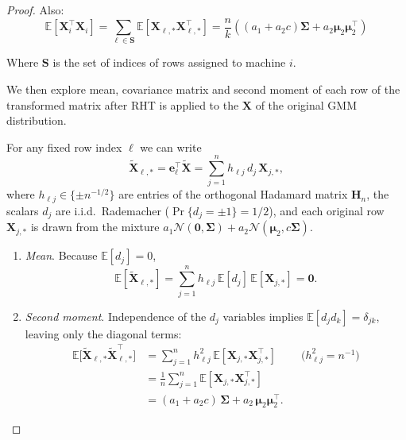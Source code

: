 \documentclass[11pt]{article}
\numberwithin{equation}{section}
\theoremstyle{plain}
\theoremstyle{definition}
\theoremstyle{remark}
\begin{document}
\begin{appendix}
\begin{proof}
          Also:
          \[
          \mathbb{E}[\mathbf{X}_i^{\top}\mathbf{X}_i] = \sum_{\ell \in \mathbf{S}} \mathbb{E}[\mathbf{X}_{\ell,\ast}\mathbf{X}_{\ell,\ast}^{\top}] = \frac{n}{k}\left((a_{1}+a_{2}c)\mathbf{\Sigma} + a_{2}\boldsymbol{\mu}_{2}\boldsymbol{\mu}_{2}^{\top}\right)
          \]

          Where $\mathbf{S}$ is the set of indices of rows assigned to machine $i$.


      We then explore mean, covariance matrix and second moment of each row of the transformed matrix after RHT is applied to the $\mathbf{X}$ of the original GMM distribution.

        For any fixed row index \( \ell \) we can write
         \[
           \mathbf{\tilde{X}}_{\ell,\ast}
            = \mathbf{e}_{\ell}^{\top}\mathbf{\tilde{X}}
            = \sum_{j=1}^{n} h_{\ell j}\,d_j\,\mathbf{X}_{j,\ast},
         \]
         where \(h_{\ell j}\in\{\pm n^{-1/2}\}\) are entries of the orthogonal
         Hadamard matrix \(\mathbf{H}_n\), the scalars \(d_j\) are i.i.d.\ Rademacher
         (\(\Pr\{d_j=\pm1\}=1/2\)), and each original row \(\mathbf{X}_{j,\ast}\) is drawn from the
         mixture \(a_{1}\mathcal N(\mathbf{0},\mathbf{\Sigma})+a_{2}\mathcal N(\boldsymbol{\mu}_{2},c\mathbf{\Sigma})\).

         \begin{enumerate}

         \item \textit{Mean}.
             Because \(\mathbb E[d_j]=0\),
             \[
             \mathbb E[\mathbf{\tilde{X}}_{\ell,\ast}]
           = \sum_{j=1}^{n} h_{\ell j}\,
           \mathbb E[d_j]\,
           \mathbb E[\mathbf{X}_{j,\ast}] = \mathbf{0} .
             \]

         \item \textit{Second moment}.
             Independence of the \(d_j\) variables implies
             \(\mathbb E[d_j d_k]=\delta_{jk}\), leaving only the diagonal terms:
             \begin{align*}
             \mathbb E\!\bigl[\mathbf{\tilde{X}}_{\ell,\ast}\mathbf{\tilde{X}}_{\ell,\ast}^{\top}\bigr]
           &= \sum_{j=1}^{n} h_{\ell j}^{2}\,\mathbb E[\mathbf{X}_{j,\ast} \mathbf{X}_{j,\ast}^{\top}]
            &&\bigl(h_{\ell j}^{2}=n^{-1}\bigr)\\[2pt]
           &= \tfrac{1}{n}\sum_{j=1}^{n}\mathbb E[\mathbf{X}_{j,\ast} \mathbf{X}_{j,\ast}^{\top}] \\[2pt]
           &= (a_{1}+a_{2}c)\,\mathbf{\Sigma} + a_{2}\,\boldsymbol{\mu}_{2}\boldsymbol{\mu}_{2}^{\top}.
             \end{align*}


\end{enumerate}
\end{proof}
\end{appendix}
\end{document}
